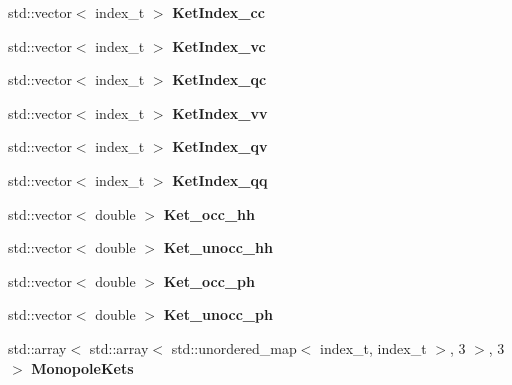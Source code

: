 \begin{DoxyCompactItemize}
\item 
\mbox{\label{classModelSpace_a2fd11bd3ada8f28815718924af028551}} 
std\+::vector$<$ index\+\_\+t $>$ {\bfseries Ket\+Index\+\_\+cc}
\item 
\mbox{\label{classModelSpace_a3611552090b99e680547303c1c3ba7d4}} 
std\+::vector$<$ index\+\_\+t $>$ {\bfseries Ket\+Index\+\_\+vc}
\item 
\mbox{\label{classModelSpace_ab7a3c3abecf7c3088b481b354e908118}} 
std\+::vector$<$ index\+\_\+t $>$ {\bfseries Ket\+Index\+\_\+qc}
\item 
\mbox{\label{classModelSpace_a607c88a1808f7a4aa6de5be828b8a20a}} 
std\+::vector$<$ index\+\_\+t $>$ {\bfseries Ket\+Index\+\_\+vv}
\item 
\mbox{\label{classModelSpace_a5b796e1269d1489c64a8fb7050cb9b27}} 
std\+::vector$<$ index\+\_\+t $>$ {\bfseries Ket\+Index\+\_\+qv}
\item 
\mbox{\label{classModelSpace_a99284c9abca3cac460ef44c0a2f1b777}} 
std\+::vector$<$ index\+\_\+t $>$ {\bfseries Ket\+Index\+\_\+qq}
\item 
\mbox{\label{classModelSpace_aae8d18bb2f4315401768ac5e8956db06}} 
std\+::vector$<$ double $>$ {\bfseries Ket\+\_\+occ\+\_\+hh}
\item 
\mbox{\label{classModelSpace_a93c2284b017ab3840eb22b26b4e253f1}} 
std\+::vector$<$ double $>$ {\bfseries Ket\+\_\+unocc\+\_\+hh}
\item 
\mbox{\label{classModelSpace_ab1f59a2ff19f05614944ed25e6a9d138}} 
std\+::vector$<$ double $>$ {\bfseries Ket\+\_\+occ\+\_\+ph}
\item 
\mbox{\label{classModelSpace_a6725304848dbc7700eae014f7b58939d}} 
std\+::vector$<$ double $>$ {\bfseries Ket\+\_\+unocc\+\_\+ph}
\item 
\mbox{\label{classModelSpace_acd3448352c763363693f9730cc95d4a1}} 
std\+::array$<$ std\+::array$<$ std\+::unordered\+\_\+map$<$ index\+\_\+t, index\+\_\+t $>$, 3 $>$, 3 $>$ {\bfseries Monopole\+Kets}

\end{DoxyCompactItemize}
